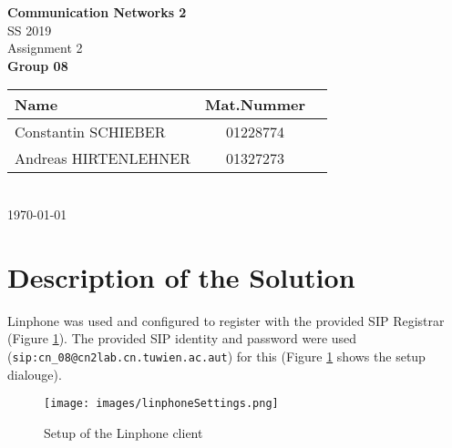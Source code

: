 \documentclass[parskip=full]{scrartcl}
\begin{document}
\begin{titlepage}
    \centering
    \vspace*{2cm}
    {\Huge \textbf{Communication Networks 2}}\\
    SS 2019\\
    \vspace*{1cm}
    {\Large Assignment 2}
    \\\vspace*{3cm}
    {\Large \textbf{Group 08}}\\
    \vspace*{1cm}
    {\large 
        \begin{tabular}{l c c}
            Name & Mat.Nummer \\ \hline
            Constantin SCHIEBER & 01228774 \\
            Andreas HIRTENLEHNER & 01327273
        \end{tabular}
    }
    \\\vspace*{7cm}
    \today
\end{titlepage}

\section{Description of the Solution}
Linphone was used and configured to register with the provided SIP Registrar (Figure \ref{fig:registerLinphone}).
The provided SIP identity and password were used (\texttt{sip:cn\_08@cn2lab.cn.tuwien.ac.aut}) for this (Figure \ref{fig:registerLinphone} shows the setup dialouge).
\begin{figure}[ht]
    \centering
   \texttt{[image: images/linphoneSettings.png]} 
    \caption{Setup of the Linphone client}
    \label{fig:registerLinphone}
\end{figure}
\end{document}
